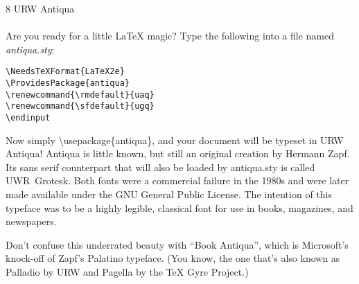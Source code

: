 \documentclass{article}
\begin{document}
\frenchspacing
\noindent
{\LARGE 8 URW Antiqua}\\
~\\
Are you ready for a little \LaTeX{} magic? Type the following into a file named \mbox{\emph{antiqua.sty}}:

\begin{verbatim}
\NeedsTeXFormat{LaTeX2e}
\ProvidesPackage{antiqua}
\renewcommand{\rmdefault}{uaq}
\renewcommand{\sfdefault}{ugq}
\endinput
\end{verbatim}

Now simply \textbackslash{}usepackage\{antiqua\}, and your document
will be typeset in URW Antiqua! Antiqua is little known, but still an
original creation by Hermann Zapf. Its sans serif counterpart that
will also be loaded by antiqua.sty is called \mbox{{\sf UWR Grotesk}}. Both
fonts were a commercial failure in the 1980s and were later made
available under the GNU General Public License.  The intention of this
typeface was to be a highly legible, classical font for use in books,
magazines, and newspapers.

Don't confuse this underrated beauty with ``Book Antiqua'', which is
Microsoft's knock-off of Zapf's Palatino typeface. (You know, the one
that's also known as Palladio by URW and Pagella by the \TeX{} Gyre
Project.)
\end{document}
